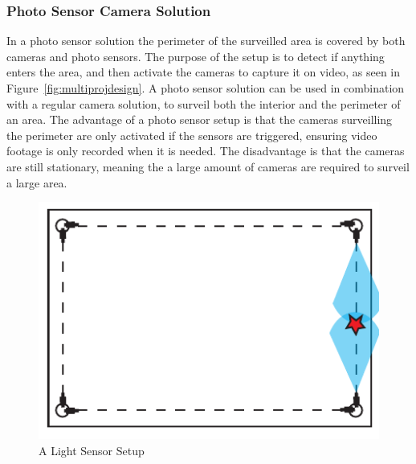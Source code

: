 \subsubsection{Photo Sensor Camera Solution}
In a photo sensor solution the perimeter of the surveilled area is covered by both cameras and photo sensors.
The purpose of the setup is to detect if anything enters the area, and then activate the cameras to capture it on video, as seen in Figure~\ref{fig:multiprojdesign}.
A photo sensor solution can be used in combination with a regular camera solution, to surveil both the interior and the perimeter of an area.
The advantage of a photo sensor setup is that the cameras surveilling the perimeter are only activated if the sensors are triggered, ensuring video footage is only recorded when it is needed.
The disadvantage is that the cameras are still stationary, meaning the a large amount of cameras are required to surveil a large area.
\begin{figure}[htb]
    \centering
    \includegraphics[width=\textwidth]{gfx/light_sensor.pdf}
    \caption{A Light Sensor Setup}
    \label{fig:photo_sensor}
\end{figure}

